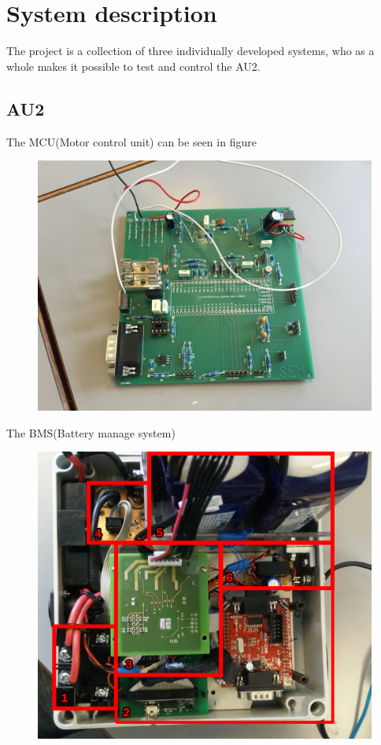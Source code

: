 \chapter{System description}
The project is a collection of three individually developed systems, who as a whole makes it possible to test and control the AU2.

\section{AU2}
The MCU(Motor control unit) can be seen in figure

\begin{figure}[h!]
\centering
\includegraphics[width=0.7\linewidth]{SubPages/Images/SD_MCS}
\caption{}
\label{fig:SD_MCS}
\end{figure}

The BMS(Battery manage system)

\begin{figure}[h!]
\centering
\includegraphics[width=0.7\linewidth]{SubPages/Images/SD_BMS}
\caption{}
\label{fig:SD_BMS}
\end{figure}

